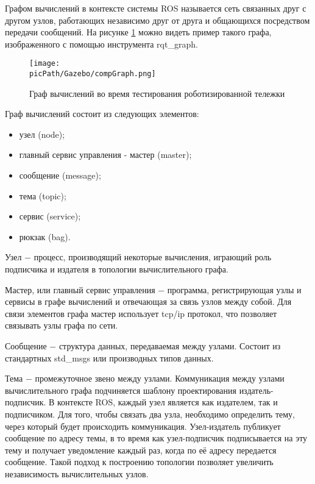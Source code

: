 \documentclass[oneside,final,14pt]{extreport}
\newcommand{\picPath}{img}
\begin{document}
Графом вычислений в контексте системы ROS называется сеть связанных друг с другом узлов, работающих независимо друг от друга и общающихся посредством передачи сообщений. 
На рисунке \ref{Figure:gazeboGraph} можно видеть пример такого графа, изображенного с помощью инструмента rqt_graph.


\begin{figure}[H]
\begin{center}
\texttt{[image: \\picPath/Gazebo/compGraph.png]}
\end{center}
  \caption{ Граф вычислений во время тестирования роботизированной тележки }
  \label{Figure:gazeboGraph}
\end{figure}


Граф вычислений состоит из следующих элементов:

\begin{itemize}
\item узел (node);
\item главный сервис управления - мастер (master);
\item сообщение (message);
\item тема (topic);
\item сервис (service);
\item рюкзак (bag).
\end{itemize}

Узел $-$  процесс, производящий некоторые вычисления, играющий роль подписчика и издателя в топологии вычислительного графа. 

Мастер, или главный сервис управления $-$ программа, регистрирующая узлы и сервисы в графе вычислений и отвечающая за связь узлов между собой. Для связи элементов графа мастер использует tcp/ip протокол, что позволяет связывать узлы графа по сети.   

Сообщение $-$ структура данных, передаваемая между узлами. Состоит из стандартных std_msgs или производных типов данных.

Тема $-$  промежуточное звено между узлами. Коммуникация между узлами вычислительного графа подчиняется шаблону проектирования издатель-подписчик. В контексте ROS, каждый узел является как издателем, так и подписчиком. Для того, чтобы связать два узла, необходимо определить тему, через который будет происходить коммуникация. Узел-издатель публикует сообщение по адресу темы, в то время как узел-подписчик подписывается на эту тему и получает уведомление каждый раз, когда по её адресу передается сообщение. Такой подход к построению топологии позволяет увеличить независимость вычислительных узлов.
\end{document}
